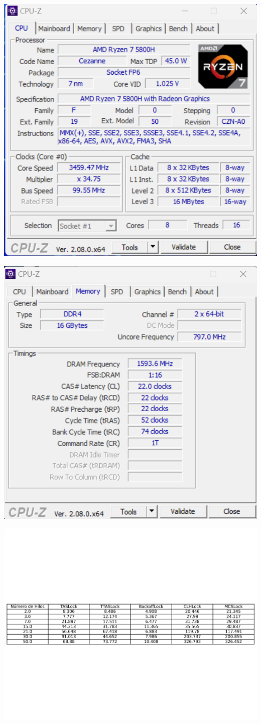 \documentclass[12pt]{article}
\begin{document}
\begin{itemize}
   \begin{center}
         \includegraphics[width=0.6\linewidth]{Practica3/ImaP3/cpu.png}
     \end{center}
      \begin{center}
         \includegraphics[width=0.6\linewidth]{Practica3/ImaP3/memoria.png}
     \end{center}
 \begin{center}
         \includegraphics[width=1.0\linewidth]{Practica3/ImaP3/t2.png}

\end{center}
\end{itemize}
\end{document}
